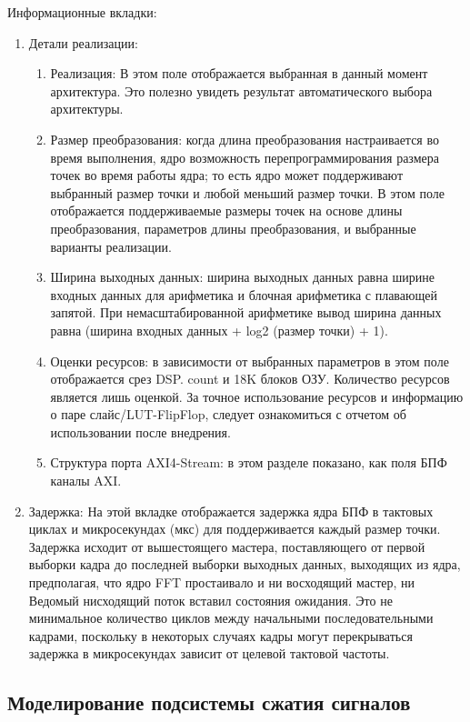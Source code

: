 Информационные вкладки:
\begin{enumerate}
	\item Детали реализации:
	\begin{enumerate}
		\item Реализация: В этом поле отображается выбранная в данный момент архитектура. Это полезно увидеть результат автоматического выбора архитектуры.
		\item  Размер преобразования: когда длина преобразования настраивается во время выполнения, ядро возможность перепрограммирования размера точек во время работы ядра; то есть ядро может поддерживают выбранный размер точки и любой меньший размер точки. В этом поле отображается
		поддерживаемые размеры точек на основе длины преобразования, параметров длины преобразования,
		и выбранные варианты реализации.

		\item Ширина выходных данных: ширина выходных данных равна ширине входных данных для
		арифметика и блочная арифметика с плавающей запятой. При немасштабированной арифметике вывод
		ширина данных равна (ширина входных данных + log2 (размер точки) + 1).
		\item Оценки ресурсов: в зависимости от выбранных параметров в этом поле отображается срез DSP.
		count и 18K блоков ОЗУ. Количество ресурсов является лишь оценкой. За точное использование ресурсов и информацию о паре слайс/LUT-FlipFlop, следует ознакомиться с отчетом об использовании после внедрения.
		\item Структура порта AXI4-Stream: в этом разделе показано, как поля БПФ каналы AXI.
	\end{enumerate}
\item Задержка: На этой вкладке отображается задержка ядра БПФ в тактовых циклах и микросекундах (мкс) для
поддерживается каждый размер точки. Задержка исходит от вышестоящего мастера, поставляющего
от первой выборки кадра до последней выборки выходных данных, выходящих из ядра, предполагая, что ядро FFT простаивало и ни восходящий мастер, ни Ведомый нисходящий поток вставил состояния ожидания. Это не минимальное количество циклов между начальными последовательными кадрами, поскольку в некоторых случаях кадры могут перекрываться задержка в микросекундах зависит от целевой тактовой частоты.
\end{enumerate}

\subsection{Моделирование подсистемы сжатия сигналов}

